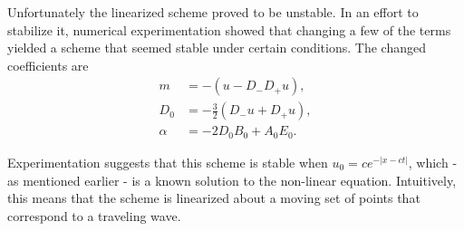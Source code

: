 Unfortunately the linearized scheme proved to be unstable. In an effort to stabilize it, numerical experimentation showed that changing a few of the terms yielded a scheme that seemed stable under certain conditions. The changed coefficients are 
\begin{align}
m &= -(u - D_{-}D_{+}u), \\
D_{0} &= -\frac{3}{2}(D_{-}u + D_{+}u), \\
\alpha &= -2D_{0}B_{0} + A_{0}E_{0}.
\end{align}

Experimentation suggests that this scheme is stable when $u_0 = c e^{-|x - ct|}$, which - as mentioned earlier - is a known solution to the non-linear equation. Intuitively, this means that the scheme is linearized about a moving set of points that correspond to a traveling wave. 



%
 
